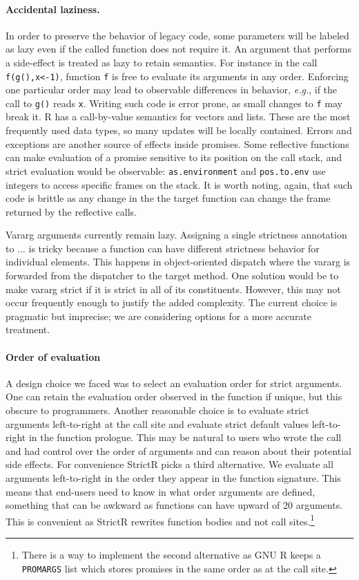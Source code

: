 \documentclass[review,creen,acmsmall]{acmart}
\newcommand{\code}[1]{\lstinline |#1|\xspace}
\renewcommand{\c}[1]{\lstinline |#1|\xspace}
\newcommand{\strictr}{{\sf StrictR}\xspace}
\newcommand{\eg}{\emph{e.g.},\xspace}
\begin{document}
\paragraph{Accidental laziness.} In order to preserve the behavior of legacy
code, some parameters will be labeled as lazy even if the called function does
not require it. An argument that performs a side-effect is treated as lazy to
retain semantics. For instance in the call \c{f(g(),x<-1)}, function \c f is
free to evaluate its arguments in any order. Enforcing one particular order may
lead to observable differences in behavior, \eg if the call to \c{g()} reads
\c{x}. Writing such code is error prone, as small changes to \c f may break it.
R has a call-by-value semantics for vectors and lists. These are the most
frequently used data types, so many updates will be locally contained. Errors
and exceptions are another source of effects inside promises. Some reflective
functions can make evaluation of a promise sensitive to its position on the call
stack, and strict evaluation would be observable: \code{as.environment} and
\code{pos.to.env} use integers to access specific frames on the stack. It is
worth noting, again, that such code is brittle as any change in the the target
function can change the frame returned by the reflective calls.

Vararg arguments currently remain lazy. Assigning a single strictness annotation
to $\dots$ is tricky because a function can have different strictness behavior
for individual elements. This happens in object-oriented dispatch where the
vararg is forwarded from the dispatcher to the target method. One solution would
be to make vararg strict if it is strict in all of its constituents. However,
this may not occur frequently enough to justify the added complexity. The
current choice is pragmatic but imprecise; we are considering options for a more
accurate treatment.


\paragraph{Order of evaluation} A design choice we faced
was to select an evaluation order for strict arguments. One can retain the
evaluation order observed in the function if unique, but this obscure to
programmers. Another reasonable choice is to evaluate strict arguments
left-to-right at the call site and evaluate strict default values left-to-right
in the function prologue. This may be natural to users who wrote the call and
had control over the order of arguments and can reason about their potential
side effects. For convenience \strictr picks a third alternative. We evaluate
all arguments left-to-right in the order they appear in the function signature.
This means that end-users need to know in what order arguments are defined,
something that can be awkward as functions can have upward of 20 arguments. This
is convenient as \strictr rewrites function bodies and not call
sites.\footnote{There is a way to implement the second alternative as GNU R
keeps a \c{PROMARGS} list which stores promises in the same order as at the call
site.}
\end{document}
